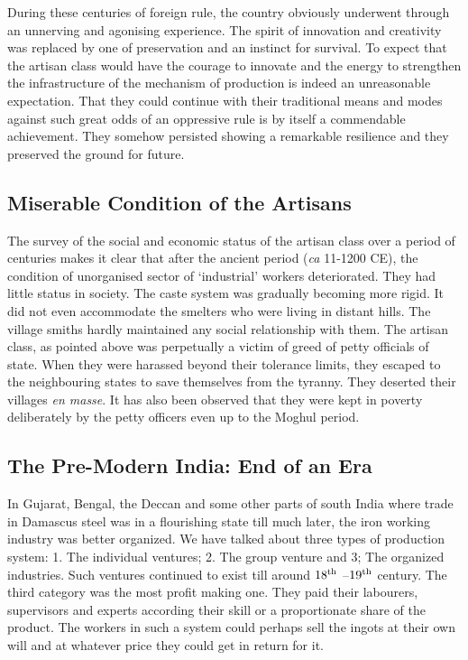 During these centuries of foreign rule, the country obviously underwent through an unnerving and agonising experience. The spirit of innovation and creativity was replaced by one of preservation and an instinct for survival. To expect that the artisan class would have the courage to innovate and the energy to strengthen the infrastructure of the mechanism of production is indeed an unreasonable expectation. That they could continue with their traditional means and modes against such great odds of an oppressive rule is by itself a commendable achievement. They somehow persisted showing a remarkable resilience and they preserved the ground for future.  

\vspace{-.3cm}

\subsection*{Miserable Condition of the Artisans}\label{chapter8-subsection-4}

\vspace{-.2cm}

The survey of the social and economic status of the artisan class over a period of centuries makes it clear that after the ancient period ({\it ca} 11-1200 CE), the condition of unorganised sector of `industrial' workers deteriorated. They had little status in society. The caste system was gradually becoming more rigid. It did not even accommodate the smelters who were living in distant hills. The village smiths hardly maintained any social relationship with them. The artisan class, as pointed above was perpetually a victim of greed of petty officials of state. When they were harassed beyond their tolerance limits, they escaped to the neighbouring states to save themselves from the tyranny. They deserted their villages {\it en masse}. It has also been observed that they were kept in poverty deliberately by the petty officers even up to the Moghul period.

\vspace{-.3cm}

\subsection*{The Pre-Modern India: End of an Era}\label{chapter8-subsection-5}

\vspace{-.2cm}

In Gujarat, Bengal, the Deccan and some other parts of south India where trade in Damascus steel was in a flourishing state till much later, the iron working industry was better organized. We have talked about three types of production system: 1. The individual ventures; 2. The group venture and 3; The organized industries. Such ventures continued to exist till around $18^{\rm th}$ –$19^{\rm th}$ century. The third category was the most profit making one. They paid their labourers, supervisors and experts according their skill or a proportionate share of the product. The workers in such a system could perhaps sell the ingots at their own will and at whatever price they could get in return for it. 

